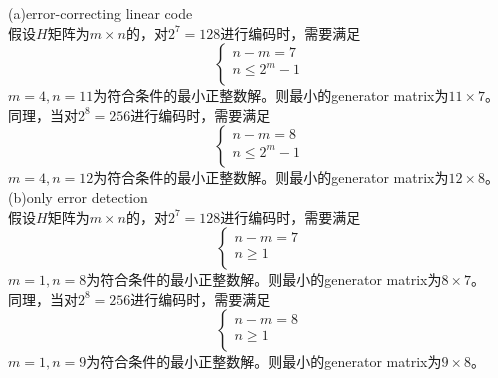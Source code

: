 \documentclass[a4paper, justified]{tufte-handout}
\begin{document}
\begin{solution}
(a)error-correcting linear code\\
假设$H$矩阵为$m\times n$的，对$2^7=128$进行编码时，需要满足
$$ \left\{
\begin{aligned}
n-m =  7 \\
n \leq 2^ m - 1 \\
\end{aligned}
\right.
$$
$m=4,n=11$为符合条件的最小正整数解。则最小的generator matrix为$11\times 7$。\\
同理，当对$2^8=256$进行编码时，需要满足
$$ \left\{
\begin{aligned}
n-m =  8 \\
n \leq 2^ m - 1 \\
\end{aligned}
\right.
$$
$m=4,n=12$为符合条件的最小正整数解。则最小的generator matrix为$12\times 8$。\\

\noindent(b)only error detection\\
假设$H$矩阵为$m\times n$的，对$2^7=128$进行编码时，需要满足
$$ \left\{
\begin{aligned}
n-m =  7 \\
n \geq 1 \\
\end{aligned}
\right.
$$
$m=1,n=8$为符合条件的最小正整数解。则最小的generator matrix为$8\times 7$。\\
同理，当对$2^8=256$进行编码时，需要满足
$$ \left\{
\begin{aligned}
n-m =  8 \\
n \geq 1 \\
\end{aligned}
\right.
$$
$m=1,n=9$为符合条件的最小正整数解。则最小的generator matrix为$9\times 8$。\\
\end{solution}

\begin{problem}[TJ 8-22]
\end{problem}
\end{document}
